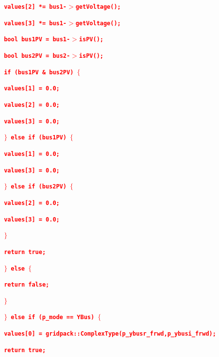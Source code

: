\documentclass[12pt]{report} %
\begin{document}
\textcolor{red}{\texttt{\textbf{      values[2] *= bus1-$\boldsymbol{\mathrm{>}}$getVoltage();}}}

\textcolor{red}{\texttt{\textbf{      values[3] *= bus1-$\boldsymbol{\mathrm{>}}$getVoltage();}}}

\textcolor{red}{\texttt{\textbf{      bool bus1PV = bus1-$\boldsymbol{\mathrm{>}}$isPV();}}}

\textcolor{red}{\texttt{\textbf{      bool bus2PV = bus2-$\boldsymbol{\mathrm{>}}$isPV();}}}

\textcolor{red}{\texttt{\textbf{      if (bus1PV \& bus2PV) $\boldsymbol{\mathrm{\{}}$}}}

\textcolor{red}{\texttt{\textbf{        values[1] = 0.0;}}}

\textcolor{red}{\texttt{\textbf{        values[2] = 0.0;}}}

\textcolor{red}{\texttt{\textbf{        values[3] = 0.0;}}}

\textcolor{red}{\texttt{\textbf{      $\boldsymbol{\mathrm{\}}}$ else if (bus1PV) $\boldsymbol{\mathrm{\{}}$}}}

\textcolor{red}{\texttt{\textbf{        values[1] = 0.0;}}}

\textcolor{red}{\texttt{\textbf{        values[3] = 0.0;}}}

\textcolor{red}{\texttt{\textbf{      $\boldsymbol{\mathrm{\}}}$ else if (bus2PV) $\boldsymbol{\mathrm{\{}}$}}}

\textcolor{red}{\texttt{\textbf{        values[2] = 0.0;}}}

\textcolor{red}{\texttt{\textbf{        values[3] = 0.0;}}}

\textcolor{red}{\texttt{\textbf{      $\boldsymbol{\mathrm{\}}}$}}}

\textcolor{red}{\texttt{\textbf{      return true;}}}

\textcolor{red}{\texttt{\textbf{    $\boldsymbol{\mathrm{\}}}$ else $\boldsymbol{\mathrm{\{}}$}}}

\textcolor{red}{\texttt{\textbf{      return false;}}}

\textcolor{red}{\texttt{\textbf{    $\boldsymbol{\mathrm{\}}}$}}}

\textcolor{red}{\texttt{\textbf{  $\boldsymbol{\mathrm{\}}}$ else if (p\_mode == YBus) $\boldsymbol{\mathrm{\{}}$}}}

\textcolor{red}{\texttt{\textbf{    values[0] = gridpack::ComplexType(p\_ybusr\_frwd,p\_ybusi\_frwd);}}}

\textcolor{red}{\texttt{\textbf{    return true;}}}
\end{document}
